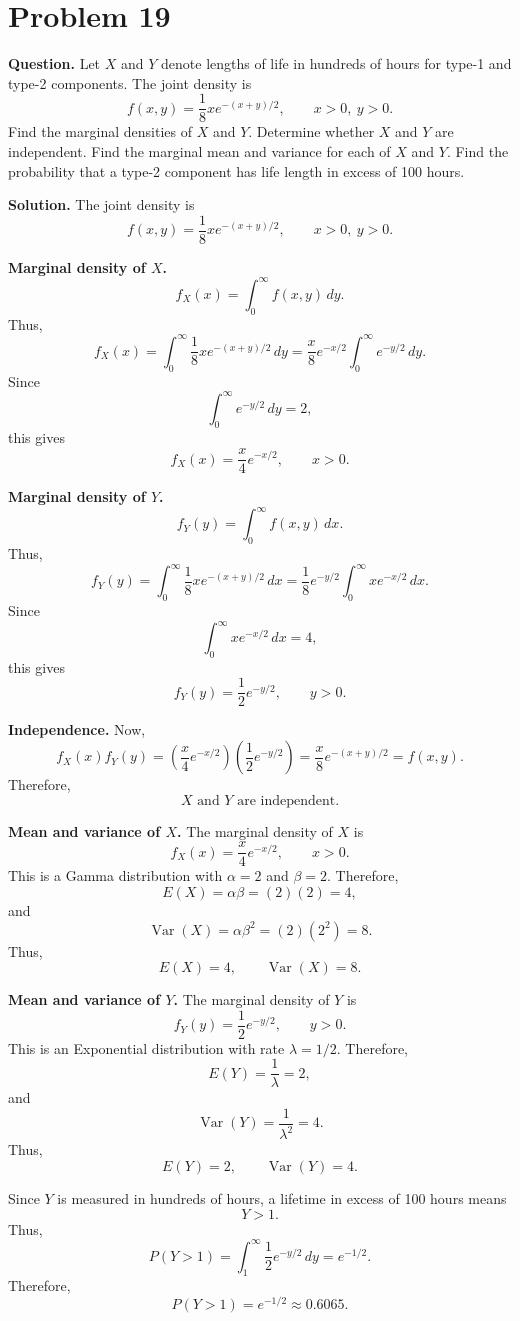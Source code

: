 \documentclass[11pt]{article}
\begin{document}
\section*{Problem 19}

\textbf{Question.} Let $X$ and $Y$ denote lengths of life in hundreds of hours for type-1 and type-2 components. The joint density is
\[
f(x,y)=\frac{1}{8}xe^{-(x+y)/2}, \qquad x>0,\ y>0.
\]
Find the marginal densities of $X$ and $Y$. Determine whether $X$ and $Y$ are independent. Find the marginal mean and variance for each of $X$ and $Y$. Find the probability that a type-2 component has life length in excess of 100 hours.

\textbf{Solution.} The joint density is
\[
f(x,y)=\frac{1}{8}xe^{-(x+y)/2}, \qquad x>0,\ y>0.
\]

\textbf{Marginal density of $X$.}
\[
f_X(x)=\int_0^\infty f(x,y)\,dy.
\]
Thus,
\[
f_X(x)=\int_0^\infty \frac{1}{8}xe^{-(x+y)/2}\,dy
=\frac{x}{8}e^{-x/2}\int_0^\infty e^{-y/2}\,dy.
\]
Since
\[
\int_0^\infty e^{-y/2}\,dy=2,
\]
this gives
\[
\boxed{f_X(x)=\frac{x}{4}e^{-x/2}, \qquad x>0.}
\]

\textbf{Marginal density of $Y$.}
\[
f_Y(y)=\int_0^\infty f(x,y)\,dx.
\]
Thus,
\[
f_Y(y)=\int_0^\infty \frac{1}{8}xe^{-(x+y)/2}\,dx
=\frac{1}{8}e^{-y/2}\int_0^\infty xe^{-x/2}\,dx.
\]
Since
\[
\int_0^\infty xe^{-x/2}\,dx=4,
\]
this gives
\[
\boxed{f_Y(y)=\frac{1}{2}e^{-y/2}, \qquad y>0.}
\]

\textbf{Independence.} Now,
\[
f_X(x)f_Y(y)=\left(\frac{x}{4}e^{-x/2}\right)\left(\frac{1}{2}e^{-y/2}\right)=\frac{x}{8}e^{-(x+y)/2}=f(x,y).
\]
Therefore,
\[
\boxed{X\text{ and }Y\text{ are independent}.}
\]

\textbf{Mean and variance of $X$.} The marginal density of $X$ is
\[
f_X(x)=\frac{x}{4}e^{-x/2}, \qquad x>0.
\]
This is a Gamma distribution with $\alpha=2$ and $\beta=2$. Therefore,
\[
E(X)=\alpha\beta=(2)(2)=4,
\]
and
\[
\operatorname{Var}(X)=\alpha\beta^2=(2)(2^2)=8.
\]
Thus,
\[
\boxed{E(X)=4, \qquad \operatorname{Var}(X)=8}.
\]

\textbf{Mean and variance of $Y$.} The marginal density of $Y$ is
\[
f_Y(y)=\frac{1}{2}e^{-y/2}, \qquad y>0.
\]
This is an Exponential distribution with rate $\lambda=1/2$. Therefore,
\[
E(Y)=\frac{1}{\lambda}=2,
\]
and
\[
\operatorname{Var}(Y)=\frac{1}{\lambda^2}=4.
\]
Thus,
\[
\boxed{E(Y)=2, \qquad \operatorname{Var}(Y)=4}.
\]

Since $Y$ is measured in hundreds of hours, a lifetime in excess of 100 hours means
\[
Y>1.
\]
Thus,
\[
P(Y>1)=\int_1^\infty \frac{1}{2}e^{-y/2}\,dy=e^{-1/2}.
\]
Therefore,
\[
\boxed{P(Y>1)=e^{-1/2}\approx 0.6065}.
\]

\newpage
\end{document}
